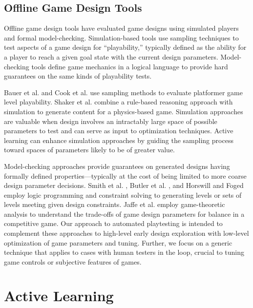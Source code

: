 \documentclass{sig-alternate}
\begin{document}
\subsection{Offline Game Design Tools}
Offline game design tools have evaluated game designs using simulated players and formal model-checking.
Simulation-based tools use sampling techniques to test aspects of a game design for ``playability,'' typically defined as the ability for a player to reach a given goal state with the current design parameters.
Model-checking tools define game mechanics in a logical language to provide hard guarantees on the same kinds of playability tests.

Bauer et al. \cite{bauer2013:rrt-generation} and Cook et al. \cite{cook2012:coopcoevo} use sampling methods to evaluate platformer game level playability.
Shaker et al. \cite{shaker2013:ropossum-test} combine a rule-based reasoning approach with simulation to generate content for a physics-based game.
Simulation approaches are valuable when design involves an intractably large space of possible parameters to test and can serve as input to optimization techniques.
Active learning can enhance simulation approaches by guiding the sampling process toward spaces of parameters likely to be of greater value.

Model-checking approaches provide guarantees on generated designs having formally defined properties---typically at the cost of being limited to more coarse design parameter decisions.
Smith et al. \cite{smith2013:quantify-play}, Butler et al. \cite{butler2013:progression-tool}, and Horswill and Foged \cite{horswill2012:levelgen} employ logic programming and constraint solving to generating levels or sets of levels meeting given design constraints.
Jaffe et al. \cite{jaffe2012:balance} employ game-theoretic analysis to understand the trade-offs of game design parameters for balance in a competitive game.
Our approach to automated playtesting is intended to complement these approaches to high-level early design exploration with low-level optimization of game parameters and tuning.
Further, we focus on a generic technique that applies to cases with human testers in the loop, crucial to tuning game controls or subjective features of games.



\section{Active Learning}
\end{document}
